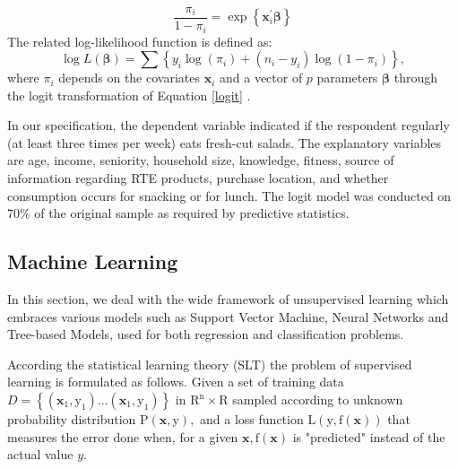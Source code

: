 \documentclass[a4,12pt]{article}
\begin{document}
\begin{equation} 
\frac{\pi_{i}}{1-\pi_{i}}=\exp \left\{\mathbf{x}_{i}^{\prime} \boldsymbol{\beta}\right\}
\end{equation} 
The related log-likelihood function is defined as:
\begin{equation} 
\log L(\boldsymbol{\beta})=\sum\left\{y_{i} \log \left(\pi_{i}\right)+\left(n_{i}-y_{i}\right) \log \left(1-\pi_{i}\right)\right\},
\end{equation}
where $\pi_{i}$ depends on the covariates $\mathbf{x}_{i}$ and a vector of $p$ parameters $\boldsymbol{\beta}$ through the logit transformation of Equation \ref{logit} .

In our specification, the dependent variable indicated if the respondent regularly (at least three times per week) eats fresh-cut salads. The explanatory variables are age, income, seniority, household size, knowledge, fitness, source of information regarding RTE products, purchase location, and whether consumption occurs for snacking or for lunch.  The logit model was conducted on 70\% of the original sample as required by predictive statistics.  


\subsection{Machine Learning}


In this section, we deal with the wide framework of unsupervised learning which embraces various models such as Support Vector Machine, Neural Networks and Tree-based Models, used for both regression and classification problems.

According the statistical learning theory (SLT) the problem of supervised learning is formulated as follows. Given a set of training data $D=\left\{\left(\mathbf{x}_{1}, \mathrm{y}_{1}\right) \ldots\left(\mathbf{x}_{1}, \mathrm{y}_{1}\right)\right\}$ in $\mathrm{R}^{\mathrm{n}} \times \mathrm{R}$ sampled according to unknown probability distribution $\mathrm{P}(\mathbf{x}, \mathrm{y}),$ and a loss function $\mathrm{L}(\mathrm{y}, \mathrm{f}(\mathbf{x}))$ that measures the error done when, for a given $\mathbf{x}, \mathrm{f}(\mathbf{x})$ is "predicted" instead of the actual value $y$.
\end{document}
